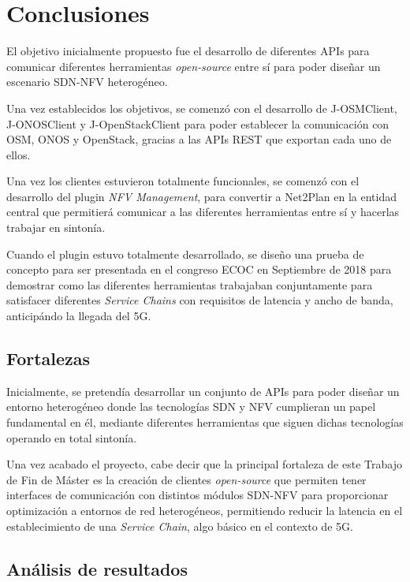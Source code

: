 \chapter{Conclusiones}
\label{conclusiones}

El objetivo inicialmente propuesto fue el desarrollo de diferentes \acp{API} para comunicar diferentes herramientas \textit{open-source} entre sí para poder diseñar un escenario \ac{SDN}-\ac{NFV} heterogéneo.

Una vez establecidos los objetivos, se comenzó con el desarrollo de J-OSMClient, J-ONOSClient y J-OpenStackClient para poder establecer la comunicación con \ac{OSM}, \ac{ONOS} y OpenStack, gracias a las \acp{API} \ac{REST} que exportan cada uno de ellos.

Una vez los clientes estuvieron totalmente funcionales, se comenzó con el desarrollo del plugin \textit{NFV Management}, para convertir a Net2Plan en la entidad central que permitierá comunicar a las diferentes herramientas entre sí y hacerlas trabajar en sintonía.

Cuando el plugin estuvo totalmente desarrollado, se diseño una prueba de concepto para ser presentada en el congreso \ac{ECOC} en Septiembre de 2018 para demostrar como las diferentes herramientas trabajaban conjuntamente para satisfacer diferentes \textit{Service Chains} con requisitos de latencia y ancho de banda, anticipándo la llegada del 5G.


\section{Fortalezas}

Inicialmente, se pretendía desarrollar un conjunto de \acp{API} para poder diseñar un entorno heterogéneo donde las tecnologías \ac{SDN} y \ac{NFV} cumplieran un papel fundamental en él, mediante diferentes herramientas que siguen dichas tecnologías operando en total sintonía.

Una vez acabado el proyecto, cabe decir que la principal fortaleza de este Trabajo de Fin de Máster es la creación de clientes \textit{open-source} que permiten tener interfaces de comunicación con distintos módulos \ac{SDN}-\ac{NFV} para proporcionar optimización a entornos de red heterogéneos, permitiendo reducir la latencia en el establecimiento de una \textit{Service Chain}, algo básico en el contexto de 5G.


\section{Análisis de resultados}

